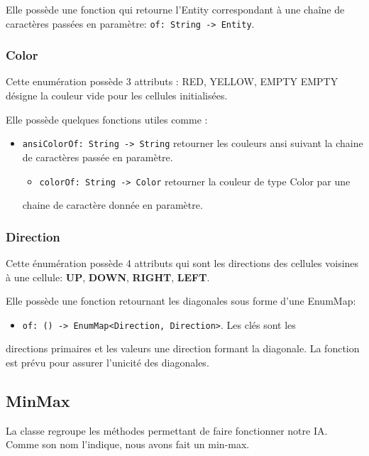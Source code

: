 \documentclass[11pt]{article}
\begin{document}
Elle possède une fonction qui retourne l'Entity correspondant à une
chaîne de caractères passées en paramètre: \texttt{of: String -> Entity}.

\subsubsection{Color\label{orgab5322d}}
\label{sec:org407b627}

Cette enumération possède 3 attributs : RED, YELLOW, EMPTY
EMPTY désigne la couleur vide pour les cellules initialisées.

Elle possède quelques fonctions utiles comme :

\begin{itemize}
\item \texttt{ansiColorOf: String -> String} retourner les couleurs ansi suivant la
chaine de caractères passée en paramètre.
\begin{itemize}
\item \texttt{colorOf: String -> Color} retourner la couleur de type Color par une
\end{itemize}
chaine de caractère donnée en paramètre.
\end{itemize}

\subsubsection{Direction\label{org64cb1eb}}
\label{sec:org11af599}

Cette énumération possède 4 attributs qui sont les directions des
cellules voisines à une cellule: \textbf{UP}, \textbf{DOWN}, \textbf{RIGHT}, \textbf{LEFT}.

Elle possède une fonction retournant les diagonales sous forme d'une
EnumMap:

\begin{itemize}
\item \texttt{of: () -> EnumMap<Direction, Direction>}. Les clés sont les
\end{itemize}
directions primaires et les valeurs une direction formant la
diagonale. La fonction est prévu pour assurer l'unicité des diagonales.

\subsection{MinMax}
\label{sec:orge350c6b}

La classe regroupe les méthodes permettant de faire fonctionner notre
IA. Comme son nom l'indique, nous avons fait un min-max.\\
\end{document}
